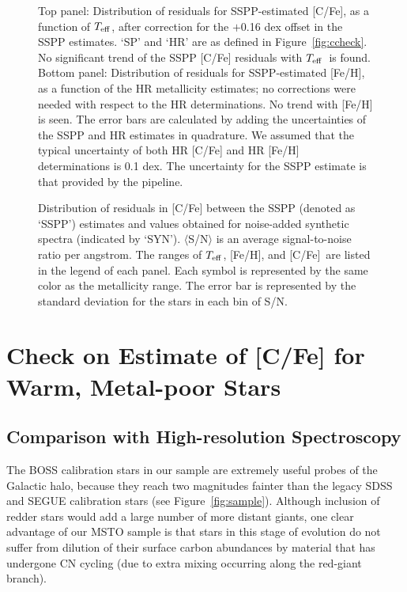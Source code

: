 \documentclass[iop]{emulateapj}
\newcommand*{\teff}{$T_{\rm eff}$}
\newcommand*{\feh}{[Fe/H]}
\newcommand*{\cfe}{[C/Fe]}
\begin{document}
\begin{figure}[t]
\centering
{}
\caption{Top panel: Distribution of residuals for SSPP-estimated
[C/Fe], as a function of \teff, after correction for the $+$0.16 dex
offset in the SSPP estimates. `SP' and `HR' are as defined in Figure~\ref{fig:ccheck}.
No significant trend of the SSPP [C/Fe]
residuals with \teff\ is found. Bottom panel: Distribution of residuals
for SSPP-estimated [Fe/H], as a function of the HR metallicity estimates; no corrections
were needed with respect to the HR determinations. No trend with [Fe/H]
is seen. The error bars are calculated by adding the uncertainties of the SSPP and HR
estimates in quadrature. We assumed that the typical uncertainty of both
HR [C/Fe] and HR [Fe/H] determinations is 0.1 dex. The uncertainty for
the SSPP estimate is that provided by the pipeline.}
\label{fig:tcheck}
\end{figure}

\begin{figure*}[t]
\centering
{}
\caption{Distribution of residuals in [C/Fe] between the SSPP (denoted
as `SSPP') estimates and values obtained for noise-added synthetic spectra
(indicated by `SYN'). $\langle$S/N$\rangle$ is an average signal-to-noise
ratio per angstrom. The ranges of \teff, \feh, and \cfe\ are listed in the
legend of each panel. Each symbol is represented by the same color as the
metallicity range. The error bar is represented by the standard deviation
for the stars in each bin of S/N.}
\label{fig:snr}
\end{figure*}

\section{Check on Estimate of [C/Fe] for Warm,  Metal-poor Stars}

\subsection{Comparison with High-resolution Spectroscopy}

The BOSS calibration stars in our sample are extremely useful probes of
the Galactic halo, because they reach two magnitudes fainter than the
legacy SDSS and SEGUE calibration stars (see Figure~\ref{fig:sample}).
Although inclusion of redder stars would add a large
number of more distant giants, one clear advantage of our MSTO sample is
that stars in this stage of evolution do not suffer from dilution of
their surface carbon abundances by material that has undergone CN
cycling (due to extra mixing occurring along the red-giant branch).
\end{document}
